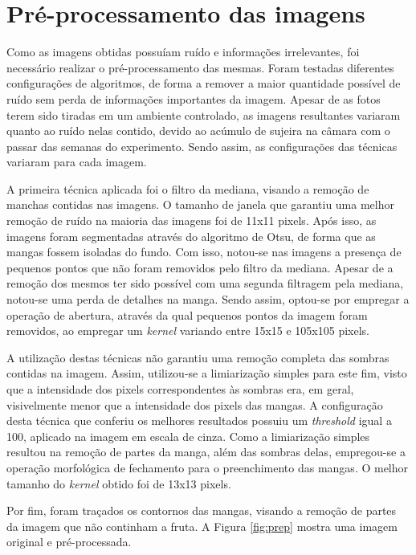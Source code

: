 \section{Pré-processamento das imagens}

Como as imagens obtidas possuíam ruído e informações irrelevantes, foi necessário realizar o pré-processamento das mesmas. Foram testadas diferentes configurações de algoritmos, de forma a remover a maior quantidade possível de ruído sem perda de informações importantes da imagem. Apesar de as fotos terem sido tiradas em um ambiente controlado, as imagens resultantes variaram quanto ao ruído nelas contido, devido ao acúmulo de sujeira na câmara com o passar das semanas do experimento. Sendo assim, as configurações das técnicas variaram para cada imagem.

A primeira técnica aplicada foi o filtro da mediana, visando a remoção de manchas contidas nas imagens. O tamanho de janela que garantiu uma melhor remoção de ruído na maioria das imagens foi de 11x11 pixels. Após isso, as imagens foram segmentadas através do algoritmo de Otsu, de forma que as mangas fossem isoladas do fundo. Com isso, notou-se nas imagens a presença de pequenos pontos que não foram removidos pelo filtro da mediana. Apesar de a remoção dos mesmos ter sido possível com uma segunda filtragem pela mediana, notou-se uma perda de detalhes na manga. Sendo assim, optou-se por empregar a operação de abertura, através da qual pequenos pontos da imagem foram removidos, ao empregar um \textit{kernel} variando entre 15x15 e 105x105 pixels. 

A utilização destas técnicas não garantiu uma remoção completa das sombras contidas na imagem. Assim, utilizou-se a limiarização simples para este fim, visto que a intensidade dos pixels correspondentes às sombras era, em geral, visivelmente menor que a intensidade dos pixels das mangas. A configuração desta técnica que conferiu os melhores resultados possuiu um \textit{threshold} igual a 100, aplicado na imagem em escala de cinza. Como a limiarização simples resultou na remoção de partes da manga, além das sombras delas, empregou-se a operação morfológica de fechamento para o preenchimento das mangas. O melhor tamanho do \textit{kernel} obtido foi de 13x13 pixels.

Por fim, foram traçados os contornos das mangas, visando a remoção de partes da imagem que não continham a fruta. A Figura \ref{fig:prep} mostra uma imagem original e pré-processada.

